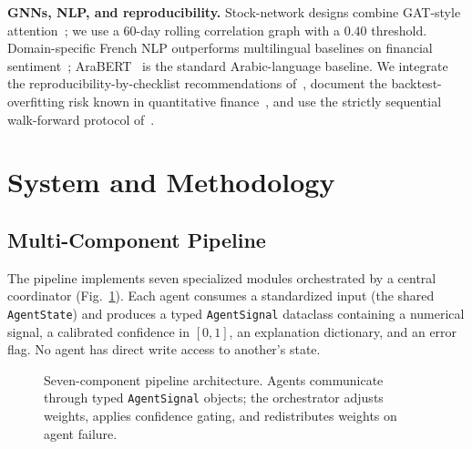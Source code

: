 \documentclass[conference]{IEEEtran}
\begin{document}
\textbf{GNNs, NLP, and reproducibility.} Stock-network designs combine GAT-style attention~\cite{ref:gat,ref:fingat,ref:mansf}; we use a 60-day rolling correlation graph with a $0.40$ threshold. Domain-specific French NLP outperforms multilingual baselines on financial sentiment~\cite{ref:financial_nlp}; AraBERT~\cite{ref:arabert} is the standard Arabic-language baseline. We integrate the reproducibility-by-checklist recommendations of~\cite{ref:pineau_repro,ref:bouthillier_repro,ref:lipton_troubling}, document the backtest-overfitting risk known in quantitative finance~\cite{ref:bailey_pseudo,ref:harvey_presidential,ref:deflated_sharpe}, and use the strictly sequential walk-forward protocol of~\cite{ref:bergmeir_cv_ts}.

\section{System and Methodology}\label{sec:methodology}

\subsection{Multi-Component Pipeline}

The pipeline implements seven specialized modules orchestrated by a central coordinator (Fig.~\ref{fig:architecture_compact}). Each agent consumes a standardized input (the shared \texttt{AgentState}) and produces a typed \texttt{AgentSignal} dataclass containing a numerical signal, a calibrated confidence in $[0,1]$, an explanation dictionary, and an error flag. No agent has direct write access to another's state.

\begin{figure}[htbp]
\centering
{}
\caption{Seven-component pipeline architecture. Agents communicate through typed \texttt{AgentSignal} objects; the orchestrator adjusts weights, applies confidence gating, and redistributes weights on agent failure.}
\label{fig:architecture_compact}
\end{figure}
\end{document}
